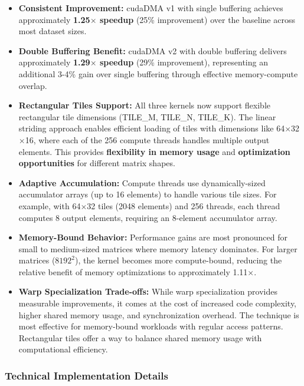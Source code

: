 \begin{itemize}
    \item \textbf{Consistent Improvement:} cudaDMA v1 with single buffering achieves approximately \textbf{1.25$\times$ speedup} (25\% improvement) over the baseline across most dataset sizes.
    
    \item \textbf{Double Buffering Benefit:} cudaDMA v2 with double buffering delivers approximately \textbf{1.29$\times$ speedup} (29\% improvement), representing an additional 3-4\% gain over single buffering through effective memory-compute overlap.
    
    \item \textbf{Rectangular Tiles Support:} All three kernels now support flexible rectangular tile dimensions (TILE\_M, TILE\_N, TILE\_K). The linear striding approach enables efficient loading of tiles with dimensions like 64$\times$32$\times$16, where each of the 256 compute threads handles multiple output elements. This provides \textbf{flexibility in memory usage} and \textbf{optimization opportunities} for different matrix shapes.
    
    \item \textbf{Adaptive Accumulation:} Compute threads use dynamically-sized accumulator arrays (up to 16 elements) to handle various tile sizes. For example, with 64$\times$32 tiles (2048 elements) and 256 threads, each thread computes 8 output elements, requiring an 8-element accumulator array.
    
    \item \textbf{Memory-Bound Behavior:} Performance gains are most pronounced for small to medium-sized matrices where memory latency dominates. For larger matrices ($8192^2$), the kernel becomes more compute-bound, reducing the relative benefit of memory optimizations to approximately 1.11$\times$.
    
    \item \textbf{Warp Specialization Trade-offs:} While warp specialization provides measurable improvements, it comes at the cost of increased code complexity, higher shared memory usage, and synchronization overhead. The technique is most effective for memory-bound workloads with regular access patterns. Rectangular tiles offer a way to balance shared memory usage with computational efficiency.
\end{itemize}

\subsubsection{Technical Implementation Details}

